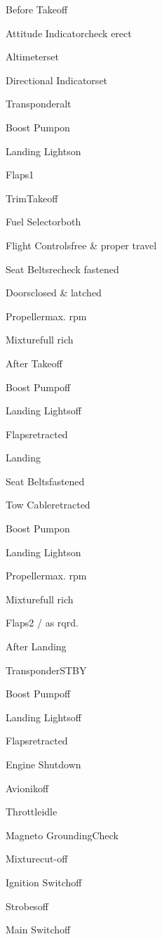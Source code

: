 \begin{checklist}{Before Takeoff}
  \item{Attitude Indicator}{check erect}
  \item{Altimeter}{set}
  \item{Directional Indicator}{set}
  \item{Transponder}{alt}
  \item{Boost Pump}{on}
  \item{Landing Lights}{on}
  \item{Flaps}{1}
  \item{Trim}{Takeoff}
  \item{Fuel Selector}{both}
  \item{Flight Controls}{free \& proper travel}
  \item{Seat Belts}{recheck fastened}
  \item{Doors}{closed \& latched}
  \item{Propeller}{max. rpm}
  \item{Mixture}{full rich}
\end{checklist}

\begin{checklist}{After Takeoff}
  \item{Boost Pump}{off}
  \item{Landing Lights}{off}
  \item{Flaps}{retracted}
\end{checklist}

\begin{checklist}{Landing}
  \item{Seat Belts}{fastened}
  \item{Tow Cable}{retracted}
  \item{Boost Pump}{on}
  \item{Landing Lights}{on}
  \item{Propeller}{max. rpm}
  \item{Mixture}{full rich}
  \item{Flaps}{2 / as rqrd.}
\end{checklist}

\begin{checklist}{After Landing}
  \item{Transponder}{STBY}
  \item{Boost Pump}{off}
  \item{Landing Lights}{off}
  \item{Flaps}{retracted}
\end{checklist}

\begin{checklist}{Engine Shutdown}
  \item{Avionik}{off}
  \item{Throttle}{idle}
  \item{Magneto Grounding}{Check}
  \item{Mixture}{cut-off}
  \item{Ignition Switch}{off}
  \item{Strobes}{off}
  \item{Main Switch}{off}
\end{checklist}

